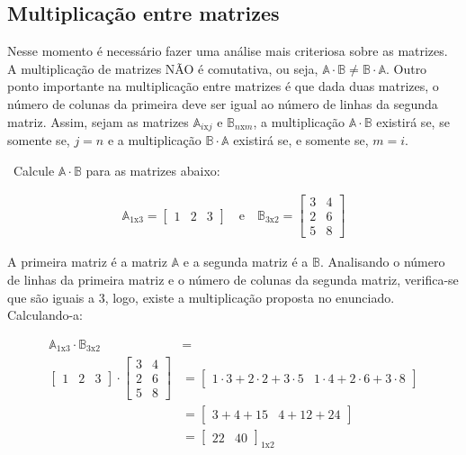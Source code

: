 \subsection{Multiplicação entre matrizes}

Nesse momento é necessário fazer uma análise mais criteriosa sobre as matrizes. A multiplicação de matrizes NÃO é comutativa, ou seja,
$\mathbb{A} \cdot \mathbb{B} \ne \mathbb{B} \cdot \mathbb{A}$. Outro ponto importante na multiplicação entre matrizes é que dada duas matrizes,
o número de colunas da primeira deve ser igual ao número de linhas da segunda matriz. Assim, sejam as matrizes $\mathbb{A}_{i\mathrm{x}j}$
e $\mathbb{B}_{n\mathrm{x}m}$, a multiplicação $\mathbb{A} \cdot \mathbb{B}$ existirá se, se somente se, $j=n$ e a multiplicação $\mathbb{B} \cdot \mathbb{A}$ existirá se, e somente se, $m=i$.
\begin{example}
	\video \, Calcule $\mathbb{A} \cdot \mathbb{B}$ para as matrizes abaixo:
	
	\begin{ceqn}
		\begin{align*}
			\mathbb{A}_{1\mathrm{x}3}=\begin{bmatrix}1 & 2 & 3\end{bmatrix}\quad\mathrm{e}\quad\mathbb{B}_{3\mathrm{x}2}=\begin{bmatrix}3 & 4\\
		2 & 6\\
		5 & 8
		\end{bmatrix}
		\end{align*}
	\end{ceqn}

	A primeira matriz é a matriz $\mathbb{A}$ e a segunda matriz é a $\mathbb{B}$. Analisando o número de linhas da primeira matriz e
	o número de colunas da segunda matriz, verifica-se que são iguais a 3, logo, existe a multiplicação proposta no enunciado. Calculando-a:
	
	
	\begin{ceqn}
		\begin{align*}
		\mathbb{A}_{1\mathrm{x}3}\cdot\mathbb{B}_{3\mathrm{x}2} & =\\
		\begin{bmatrix}1 & 2 & 3\end{bmatrix}\cdot\begin{bmatrix}3 & 4\\
		2 & 6\\
		5 & 8
		\end{bmatrix} & =  \begin{bmatrix}1\cdot3+2\cdot2+3\cdot5 & 1\cdot4+2\cdot6+3\cdot8\end{bmatrix}\\
		& =  \begin{bmatrix}3+4+15 & 4+12+24\end{bmatrix}\\
		& =  \begin{bmatrix}22 & 40\end{bmatrix}_{1\mathrm{x}2}
		\end{align*}
	\end{ceqn}
	

\end{example}
